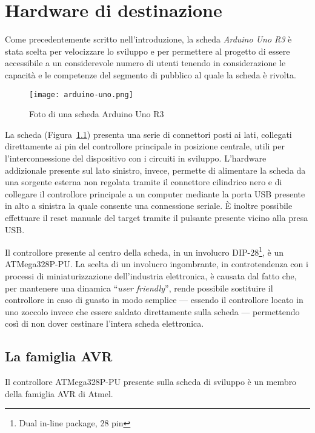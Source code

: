\chapter{Hardware di destinazione}
    
Come precedentemente scritto nell'introduzione, la scheda \textit{Arduino Uno R3} è stata scelta per velocizzare lo sviluppo e per permettere al progetto di essere accessibile a un considerevole numero di utenti tenendo in considerazione le capacità e le competenze del segmento di pubblico al quale la scheda è rivolta.

\begin{figure}[b]
    \centering
    \texttt{[image: arduino-uno.png]}
    \caption[]{Foto di una scheda Arduino Uno R3\cite{img:arduino-uno-r3}}\label{fig:arduino-uno-r3}
\end{figure}

La scheda (Figura~\ref{fig:arduino-uno-r3}) presenta una serie di connettori posti ai lati, collegati direttamente ai pin del controllore principale in posizione centrale, utili per l'interconnessione del dispositivo con i circuiti in sviluppo.
L'hardware addizionale presente sul lato sinistro, invece, permette di alimentare la scheda da una sorgente esterna non regolata tramite il connettore cilindrico nero e di collegare il controllore principale a un computer mediante la porta USB presente in alto a sinistra la quale consente una connessione seriale.
È inoltre possibile effettuare il reset manuale del target tramite il pulsante presente vicino alla presa USB.\@

Il controllore presente al centro della scheda, in un involucro DIP-28\footnote{Dual in-line package, 28 pin}, è un ATMega328P-PU\cite{site:arduino-uno-doc}. La scelta di un involucro ingombrante, in controtendenza con i processi di miniaturizzazione dell'industria elettronica, è causata dal fatto che, per mantenere una dinamica ``\textit{user friendly}'', rende possibile sostituire il controllore in caso di guasto in modo semplice --- essendo il controllore locato in uno zoccolo invece che essere saldato direttamente sulla scheda --- permettendo così di non dover cestinare l'intera scheda elettronica.\cite{site:arduino-uno-doc}

\section{La famiglia AVR}

Il controllore ATMega328P-PU presente sulla scheda di sviluppo è un membro della famiglia AVR di Atmel\cite[1]{avr:m328p}.

